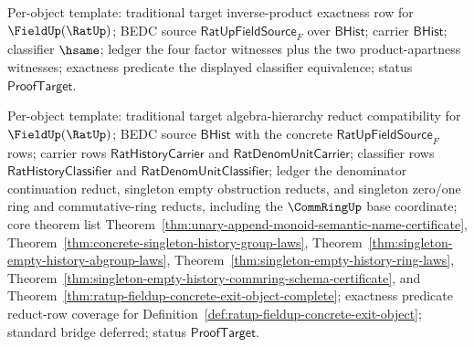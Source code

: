 Per-object template: traditional target inverse-product exactness row for
$\FieldUp(\RatUp)$; BEDC source $\mathsf{RatUpFieldSource}_F$ over
$\mathsf{BHist}$; carrier $\mathsf{BHist}$; classifier $\hsame$; ledger the four
factor witnesses plus the two product-apartness witnesses; exactness predicate
the displayed classifier equivalence; status $\mathsf{ProofTarget}$.

Per-object template: traditional target algebra-hierarchy reduct compatibility
for $\FieldUp(\RatUp)$; BEDC source $\mathsf{BHist}$ with the concrete
$\mathsf{RatUpFieldSource}_F$ rows; carrier rows
$\mathsf{RatHistoryCarrier}$ and $\mathsf{RatDenomUnitCarrier}$; classifier rows
$\mathsf{RatHistoryClassifier}$ and $\mathsf{RatDenomUnitClassifier}$; ledger
the denominator continuation reduct, singleton empty obstruction reducts, and
singleton zero/one ring and commutative-ring reducts, including the
$\CommRingUp$ base coordinate; core theorem list
Theorem~\ref{thm:unary-append-monoid-semantic-name-certificate},
Theorem~\ref{thm:concrete-singleton-history-group-laws},
Theorem~\ref{thm:singleton-empty-history-abgroup-laws},
Theorem~\ref{thm:singleton-empty-history-ring-laws},
Theorem~\ref{thm:singleton-empty-history-commring-schema-certificate}, and
Theorem~\ref{thm:ratup-fieldup-concrete-exit-object-complete}; exactness
predicate reduct-row coverage for
Definition~\ref{def:ratup-fieldup-concrete-exit-object}; standard bridge
deferred; status $\mathsf{ProofTarget}$.

